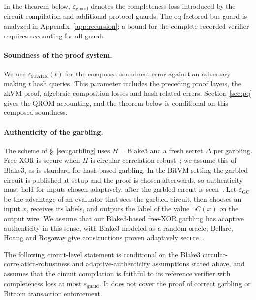 \documentclass[11pt]{article}
\newcommand{\blake}{\mathrm{Blake3}}
\begin{document}
In the theorem below, $\varepsilon_{\mathrm{guard}}$ denotes the completeness
loss introduced by the circuit compilation and additional protocol guards.
The eq-factored bus guard is analyzed in Appendix~\ref{app:recursion}; a
bound for the complete recorded verifier requires accounting for all guards.

\paragraph{Soundness of the proof system.} We use
$\varepsilon_{\mathrm{STARK}}(t)$ for the composed soundness error against
an adversary making $t$ hash queries. This parameter includes the preceding
proof layers, the zkVM proof, algebraic composition losses and hash-related
errors. Section~\ref{sec:pq} gives the QROM accounting, and the theorem below
is conditional on this composed soundness.

\paragraph{Authenticity of the garbling.} The scheme of \S~\ref{sec:garbling}
uses $H=\blake$ and a fresh secret $\Delta$ per garbling. Free-XOR is secure when $H$ is circular correlation
robust~\cite{ckkz12freexor}; we assume this of Blake3, as is standard for
hash-based garbling. In the BitVM setting the garbled circuit is published at
setup and the proof is chosen afterwards, so authenticity must hold for inputs
chosen adaptively, after the garbled circuit is seen~\cite{bhr12adaptive}. Let
$\varepsilon_{\mathrm{GC}}$ be the advantage of an evaluator that sees the garbled
circuit, then chooses an input $x$, receives its labels, and outputs the label of
the value $\neg C(x)$ on the output wire. We assume that our Blake3-based
free-XOR garbling has adaptive authenticity in this sense, with Blake3 modeled as
a random oracle; Bellare, Hoang and Rogaway give constructions proven adaptively
secure~\cite{bhr12adaptive}.

\noindent The following circuit-level statement is conditional on the Blake3
circular-correlation-robustness and adaptive-authenticity assumptions stated
above, and assumes that the circuit compilation is faithful to its reference
verifier with completeness loss at most $\varepsilon_{\mathrm{guard}}$.
It does not cover the proof of correct garbling or Bitcoin transaction
enforcement.
\end{document}
